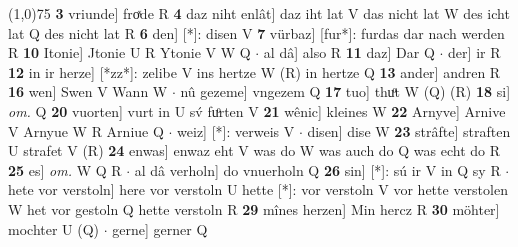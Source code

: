 \documentclass[8pt,a4paper,notitlepage]{article}
\begin{document}
\begin{table}[ht]
\begin{minipage}[t]{0.5\linewidth}
\line(1,0){75} \newline
\textbf{3} vriunde] froͯde R \textbf{4} daz niht enlât] daz iht lat V das nicht lat W des icht lat Q des nicht lat R \textbf{6} den] [*]: disen V \textbf{7} vürbaz] [fur*]: furdas dar nach werden R \textbf{10} Itonie] Jtonie U R Ytonie V W Q  $\cdot$ al dâ] also R \textbf{11} daz] Dar Q  $\cdot$ der] ir R \textbf{12} in ir herze] [*zz*]: zelibe V ins hertze W (R) in hertze Q \textbf{13} ander] andren R \textbf{16} wen] Swen V Wann W  $\cdot$ nû gezeme] vngezem Q \textbf{17} tuo] thuͦt W (Q) (R) \textbf{18} si] \textit{om.} Q \textbf{20} vuorten] vurt in U sv́ fuͦrten V \textbf{21} wênic] kleines W \textbf{22} Arnyve] Arnive V Arnyue W R Arniue Q  $\cdot$ weiz] [*]: verweis V  $\cdot$ disen] dise W \textbf{23} strâfte] straften U strafet V (R) \textbf{24} enwas] enwaz eht V was do W was auch do Q was echt do R \textbf{25} es] \textit{om.} W Q R  $\cdot$ al dâ verholn] do vnuerholn Q \textbf{26} sin] [*]: sú ir V in Q sy R  $\cdot$ hete vor verstoln] here vor verstoln U hette [*]: vor verstoln V vor hette verstolen W het vor gestoln Q hette verstoln R \textbf{29} mînes herzen] Min hercz R \textbf{30} möhter] mochter U (Q)  $\cdot$ gerne] gerner Q \newline
\end{minipage}
\end{table}
\end{document}
